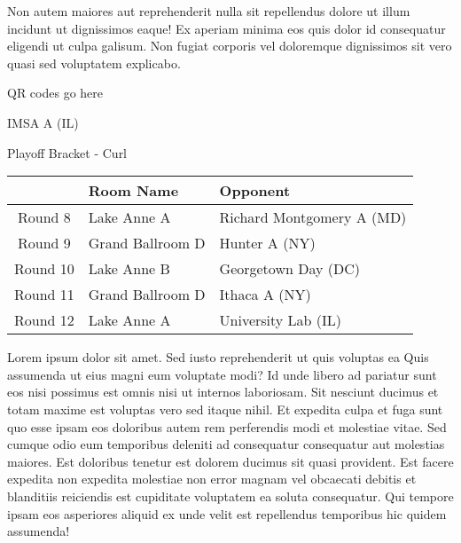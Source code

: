 \documentclass{article}%
\begin{document}
\newline%
Non autem maiores aut reprehenderit nulla sit repellendus dolore ut illum incidunt ut dignissimos eaque! Ex aperiam minima eos quis dolor id consequatur eligendi ut culpa galisum. Non fugiat corporis vel doloremque dignissimos sit vero quasi sed voluptatem explicabo.\newline%
\newline%
%
\vspace*{30pt}%
\begin{center}%
\begin{Huge}%
QR codes go here%
\end{Huge}%
\end{center}%
\newpage%
\begin{center}%
\begin{Huge}%
IMSA A (IL)%
\end{Huge}%
\vspace*{8pt}%
\linebreak%
\begin{Large}%
Playoff Bracket {-} Curl%
\end{Large}%
\end{center}%
%
\begin{tabularx}{\textwidth}{|c|Y|Y|}%
\hline%
&Room Name&Opponent\\%
\hline%
Round 8&Lake Anne A&Richard Montgomery A (MD)\\%
Round 9&Grand Ballroom D&Hunter A (NY)\\%
Round 10&Lake Anne B&Georgetown Day (DC)\\%
Round 11&Grand Ballroom D&Ithaca A (NY)\\%
Round 12&Lake Anne A&University Lab (IL)\\%
\hline%
\end{tabularx}%
\vspace*{8pt}%
\linebreak%
\newline%
\newline%
Lorem ipsum dolor sit amet. Sed iusto reprehenderit ut quis voluptas ea Quis assumenda ut eius magni eum voluptate modi? Id unde libero ad pariatur sunt eos nisi possimus est omnis nisi ut internos laboriosam. Sit nesciunt ducimus et totam maxime est voluptas vero sed itaque nihil. Et expedita culpa et fuga sunt quo esse ipsam eos doloribus autem rem perferendis modi et molestiae vitae.\newline%
\newline%
Sed cumque odio eum temporibus deleniti ad consequatur consequatur aut molestias maiores. Est doloribus tenetur est dolorem ducimus sit quasi provident. Est facere expedita non expedita molestiae non error magnam vel obcaecati debitis et blanditiis reiciendis est cupiditate voluptatem ea soluta consequatur. Qui tempore ipsam eos asperiores aliquid ex unde velit est repellendus temporibus hic quidem assumenda!\newline%
\end{document}
